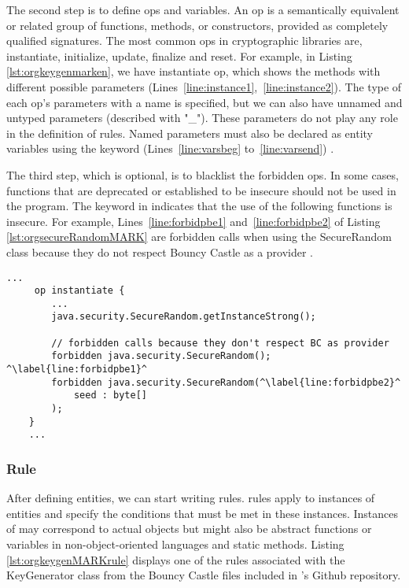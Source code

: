 The second step is to define ops and variables. An op is a semantically equivalent or related group of functions, methods, or constructors, provided as completely qualified signatures. The most common ops in cryptographic libraries are, instantiate, initialize, update, finalize and reset. For example, in Listing \ref{lst:orgkeygenmarken}, we have instantiate op, which shows the  methods with different possible parameters (Lines~\ref{line:instance1},~\ref{line:instance2}). The type of each op's parameters with a name is specified, but we can also have unnamed and untyped parameters (described with "\_"). These parameters do not play any role in the definition of rules. Named parameters must also be declared as entity variables using the  keyword (Lines~\ref{line:varsbeg} to~\ref{line:varsend}) \cite{cod}.

The third step, which is optional, is to blacklist the forbidden ops. In some cases, functions that are deprecated or established to be insecure should not be used in the program. The  keyword in \MARK{} indicates that the use of the following functions is insecure. For example, Lines~\ref{line:forbidpbe1} and~\ref{line:forbidpbe2} of Listing \ref{lst:orgsecureRandomMARK} are forbidden calls when using the SecureRandom class because they do not respect Bouncy Castle as a provider \cite{cod}.

\begin{lstlisting}[language=MARK,caption= Part of \MARK{} entities for java.security.SecureRandom from Bouncy Castle ruleset \cite{codyzegit}., label={lst:orgsecureRandomMARK}, escapechar=^]
    ...
     op instantiate {
        ...
        java.security.SecureRandom.getInstanceStrong();
        
        // forbidden calls because they don't respect BC as provider
        forbidden java.security.SecureRandom(); ^\label{line:forbidpbe1}^
        forbidden java.security.SecureRandom(^\label{line:forbidpbe2}^
            seed : byte[]
        );
    }
    ...
\end{lstlisting}


\subsubsection{Rule}
\label{subsubsec:rule}
After defining entities, we can start writing rules. \MARK{} rules apply to instances of entities and specify the conditions that must be met in these instances. Instances of \MARK{} may correspond to actual objects but might also be abstract functions or variables in non-object-oriented languages and static methods. Listing \ref{lst:orgkeygenMARKrule} displays one of the \MARK{} rules associated with the KeyGenerator class from the Bouncy Castle \MARK{} files included in \codyze's Github repository.

